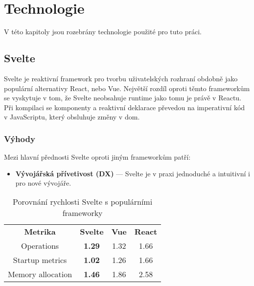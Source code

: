 \chapter{Technologie}

V této kapitoly jsou rozebrány technologie použité pro tuto práci.

\section{Svelte}\label{sec:Svelte}

Svelte je reaktivní framework pro tvorbu uživatelských rozhraní obdobně jako populární alternativy React, nebo Vue.
Největší rozdíl oproti těmto frameworkům se vyskytuje v tom, že Svelte neobsahuje runtime jako tomu je právě v Reactu.
Při kompilaci se komponenty a reaktivní deklarace převedou na imperativní kód v JavaScriptu, který obsluhuje změny v \gls{dom}.

\subsection{Výhody}

Mezi hlavní přednosti Svelte oproti jiným frameworkům patří:

\begin{itemize}
    \item \textbf{Vývojářská přívetivost (DX)} --- Svelte je v praxi jednoduché a intuitivní i pro nové vývojáře.
\end{itemize}


\begin{table}[ht]
    \begin{tabular}{c|c|c|c}
        \bfseries Metrika & \bfseries Svelte & \bfseries Vue & \bfseries React \\\Midrule{}
        Operations        & \textbf{1.29}    & 1.32          & 1.66            \\
        Startup metrics   & \textbf{1.02}    & 1.26          & 1.66            \\
        Memory allocation & \textbf{1.46}    & 1.86          & 2.58
    \end{tabular}
    \caption{Porovnání rychlosti Svelte s populárními frameworky}
    \label{tab:foobar}
\end{table}

